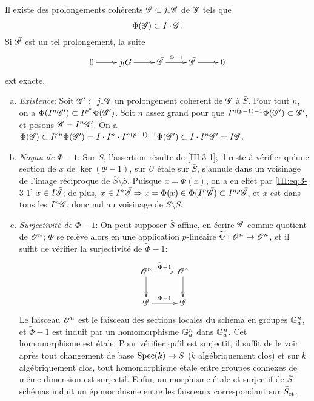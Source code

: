 \begin{lemma_}\label{III:3-3}
Il existe des prolongements cohérents $\bar{\mathscr{G}}\subset j_*\mathscr{G}$ de $\mathscr{G}$ tels 
que 
\begin{equation}\label{III:eq:3-3-1}
  \Phi(\bar{\mathscr{G}})\subset I\cdot \bar{\mathscr{G}}\text{.}
\end{equation}
Si $\bar{\mathscr{G}}$ est un tel prolongement, la suite 
\begin{equation}\label{III:eq:3-3-2}
\xymatrix{
  0 \ar[r] 
    & j_! G \ar[r] 
    & \bar\cG \ar[r]^-{\Phi-1} 
    & \bar\cG \ar[r] 
    & 0
}
\end{equation}
ext exacte.
\end{lemma_}
\begin{enumerate}[a)]
  \item \emph{Existence}: Soit $\mathscr{G}'\subset j_*\mathscr{G}$ un prolongement cohérent 
    de $\mathscr{G}$ à $\bar S$. Pour tout $n$, on a 
    $\Phi(I^n \mathscr{G}')\subset I^{p^n}\Phi(\mathscr{G}')$. Soit $n$ assez grand pour 
    que $I^{n(p-1)-1}\Phi(\mathscr{G}')\subset \mathscr{G}'$, et posons $\bar{\mathscr{G}}=I^n\mathscr{G}'$. 
    On a $\Phi(\bar{\mathscr{G}})\subset I^{p n}\Phi(\mathscr{G}') 
    =I\cdot I^n\cdot I^{n(p-1)-1}\Phi(\mathscr{G}')\subset I\cdot I^n\mathscr{G}' 
    = I\bar{\mathscr{G}}$. 
  \item \emph{Noyau de $\Phi-1$}: Sur $S$, l'assertion résulte de 
    \ref{III:3-1}; il reste à vérifier qu'une section de $x$ de 
    $\ker(\Phi-1)$, sur $U$ étale sur $\bar S$, s'annule dans un voisinage de 
    l'image réciproque de $\bar S\setminus S$. Puisque $x=\Phi(x)$, on a en 
    effet par \eqref{III:eq:3-3-1} $x\in I\bar{\mathscr{G}}$; de plus, 
    $x\in I^n\bar{\mathscr{G}}\Rightarrow x=\Phi(x)\in\Phi(I^n\bar{\mathscr{G}})\subset I^{n p}\bar{\mathscr{G}}$, et $x$ est dans tous les $I^n\bar{\mathscr{G}}$, donc nul au voisinage de 
    $\bar S\setminus S$.
  \item \emph{Surjectivité de $\Phi-1$}: On peut supposer $\bar S$ affine, en 
    écrire $\mathscr{G}$ comme quotient de $\mathscr{O}^n$; $\Phi$ se relève alors en une 
    application $p$-linéaire $\widetilde\Phi:\mathscr{O}^n\to\mathscr{O}^n$, et il suffit de 
    vérifier la surjectivité de $\widetilde\Phi-1$:
    \[\xymatrix{
      \cO^n \ar[r]^-{\widetilde \Phi-1} \ar[d] 
        & \cO^n \ar[d] \\
      \cG \ar[r]^-{\Phi-1} 
        & \cG 
    }\]
    Le faisceau $\mathscr{O}^n$ est le faisceau des sections locales du schéma en 
    groupes $\mathbb{G}_a^n$, et $\widetilde\Phi-1$ est induit par un homomorphisme 
    $\mathbb{G}_a^n$ dans $\mathbb{G}_a^n$. Cet homomorphisme est étale. Pour vérifier 
    qu'il est surjectif, il suffit de le voir après tout changement de base 
    $\operatorname{Spec}(k)\to\bar S$ ($k$ algébriquement clos) et sur $k$ algébriquement 
    clos, tout homomorphisme étale entre groupes connexes de même dimension 
    est surjectif. Enfin, un morphisme étale et surjectif de 
    $\bar S$-schémas induit un épimorphisme entre les faisceaux 
    correspondant sur ${\bar S}_{\textnormal{et}}$.
\end{enumerate}





